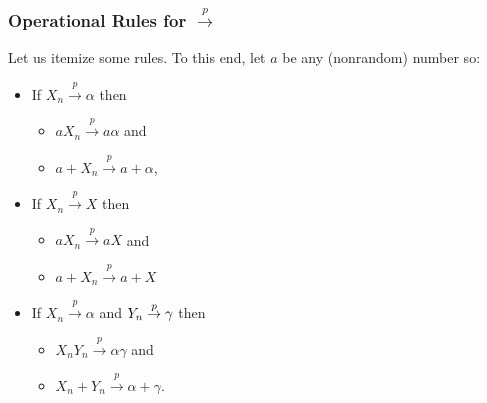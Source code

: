 \documentclass[notes=show,smaller,handout]{beamer}\usepackage[]{graphicx}\usepackage[]{color}
\newenvironment{stepitemize}{\begin{itemize}[<+->]}{\end{itemize} }
\begin{document}
\begin{frame}%

\frametitle{Operational Rules for $\overset{p}{\rightarrow }$}
Let us itemize some rules. To this end, let $a$ be any (nonrandom) number so:


\begin{stepitemize}
\item If $X_{n}\overset{p}{\rightarrow }%
\alpha $ then \vspace{0.3cm}
\begin{stepitemize}
\item $aX_{n}\overset{p}{\rightarrow }a\alpha $ and \vspace{0.3cm}
\item $a+X_{n}\overset{p}{\rightarrow }a+\alpha$,
\end{stepitemize}

\vspace{0.4cm}
\item If $X_{n}\overset{p}{\rightarrow }X $ then \vspace{0.3cm}
\begin{stepitemize}
\item $aX_{n}\overset{p}{\rightarrow }aX $ and \vspace{0.6cm}
\item $a+X_{n}\overset{p}{\rightarrow }a+X $
\end{stepitemize}

\vspace{0.4cm}
\item If $X_{n}\overset{p}{\rightarrow }\alpha $ and $Y_{n}\overset{p}{%
\rightarrow }\gamma $ then \vspace{0.3cm}
\begin{stepitemize}
\item $X_{n}Y_{n}\overset{p}{\rightarrow }\alpha \gamma$ and \vspace{0.3cm}
\item $X_{n}+Y_{n}\overset{p}{\rightarrow }\alpha +\gamma$.
\end{stepitemize}

\end{stepitemize}

\end{frame}%
\end{document}
